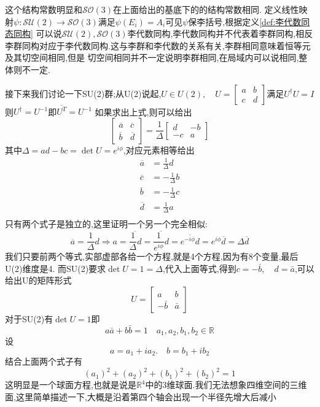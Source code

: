 \documentclass[../main.tex]{subfiles}
\begin{document}
 这个结构常数明显和$\mathscr{SO}(3)$在上面给出的基底下的的结构常数相同.
 定义线性映射$\psi:\mathscr{SU}(2) \rightarrow \mathscr{SO}(3)$满足$\psi(E_i) = A_i$可见$\psi$保李括号,根据定义\ref{def:李代数同态同构}
 可以说$\mathscr{SU}(2),\mathscr{SO}(3)$李代数同构,李代数同构并不代表着李群同构,相反李群同构对应于李代数同构.这与李群和李代数的关系有关,李群相同意味着恒等元及其切空间相同,但是
 切空间相同并不一定说明李群相同,在局域内可以说相同,整体则不一定.

 接下来我们讨论一下SU(2)群;从U(2)说起,$U \in U(2),\quad U = \begin{bmatrix}
     a&b\\
     c&d
 \end{bmatrix}$满足$U^\dagger U = I$则$U^\dagger = U^{-1}$即$\overline{U^T} = U^{-1}$
 如果求出上式,则可以给出$$\begin{bmatrix}
     \overline{a}&\overline{c}\\
     \overline{b}&\overline{d}
 \end{bmatrix}=\frac{1}{\Delta}\begin{bmatrix}
     d&-b\\
     -c&a
 \end{bmatrix}$$其中$\Delta = ad - bc = \det U = e^{i\phi}$,对应元素相等给出\begin{align*}
     \overline{a}&= \frac{1}{\Delta}d  \\      
     \overline{c}&= -\frac{1}{\Delta}b\\
     \overline{b}&= -\frac{1}{\Delta}c\\
     \overline{d}&= \frac{1}{\Delta}a\\
 \end{align*}
 只有两个式子是独立的,这里证明一个另一个完全相似:
 $$\overline{a} = \frac{1}{\Delta}d \Longrightarrow a = \overline{\frac{1}{\Delta}{d}} = \overline{\frac{1}{e^{i\phi}}d} = \overline{e^{-i\phi}d} = e^{i\phi}\overline{d} =\Delta \overline{d}$$
 我们只要前两个等式,实部虚部各给一个方程,就是4个方程,因为有8个变量,最后U(2)维度是4.
 而SU(2)要求$\det U = 1 = \Delta$,代入上面等式,得到$c=-\bar{b},\quad d= \bar{a}$,可以给出U的矩阵形式$$U = \begin{bmatrix}
     a&b\\
     -\bar{b}&\bar{a}
 \end{bmatrix}$$
 对于SU(2)有$\det U = 1$即 $$a\bar{a} + b \bar{b} = 1\quad a_1,a_2,b_1,b_2 \in \mathbb{R}$$
 设$$a = a_1 +i a_2.\quad b = b_1 + ib_2$$
 结合上面两个式子有$$(a_1)^2 + (a_2)^2 +(b_1)^2 + (b_2)^2 = 1$$这明显是一个球面方程,也就是说是$\mathbb{R}^4$中的3维球面.我们无法想象四维空间的三维面,这里简单描述一下,大概是沿着第四个轴会出现一个半径先增大后减小
\end{document}
